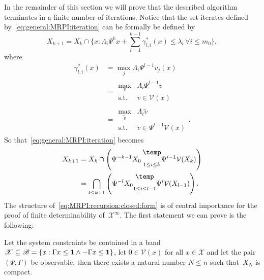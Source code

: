 In the remainder of this section we will prove that the described algorithm terminates 
in a finite number of iterations.
%
Notice that the set iterates defined by~\eqref{eq:general:MRPI:iteration} can be formally
be defined by
%
\begin{equation}
	X_{k+1} = X_k \cap \{x: \Lambda_i\Psi^k x + \sum_{l=1}^{k-1} \gamma_{l,i}^\ast(x)\leq\lambda_i\,
	\forall i\leq m_0\},
\end{equation}
%
where
%
\begin{equation}\begin{split}
	\gamma_{l,i}^\ast(x) &= \max_j \Lambda_i\Psi^{l-1} v_j(x) \\
	&= \begin{array}{rl} \max_v &\Lambda_i\Psi^{l-1} v\\
		\text{s.t.} & v\in\mathcal V(x)\end{array} \\
	&= \begin{array}{rl} \max_{\tilde v} &\Lambda_i \tilde v\\
		\text{s.t.} & \tilde v\in \Psi^{l-1}\mathcal V(x) \end{array}.
\end{split}\end{equation}
%
So that~\eqref{eq:general:MRPI:iteration} becomes
%
\begin{align}
	X_{k+1} &= X_k \cap \left( \Psi^{-k-1} X_0\, \underset{1\leq i\leq k}{\bigominus} 
	\Psi^{i-1}\mathcal V(X_k) \right)\nonumber \\
	&=\bigcap_{l\leq k+1}\left(\Psi^{-l} X_0 \underset{1\leq i\leq l-1}{\bigominus} 
	\Psi^{i}\mathcal V(X_{l-1}) \right). \label{eq:MRPI:recursion:closed:form}
\end{align}
%
The structure of~\eqref{eq:MRPI:recursion:closed:form} is of central importance for the proof
of finite determinability of~$\mathcal X^\infty$.
%
The first statement we can prove is the following:
%
\begin{thm}\label{thm:band:implies:compactness}
Let the system constraints be contained in a band~$\mathscr X\subseteq \mathscr B 
=\{x: \Gamma x\leq{\bf{1}}\wedge -\Gamma x\leq{\bf{1}}\}$, let $0\in\mathcal V(x)$ for all $x\in\mathscr X$ 
and let the pair $(\Psi,\Gamma)$ be observable, then there exists a natural number $N\leq n$ such 
that~$X_N$ is compact.
\end{thm}
%
